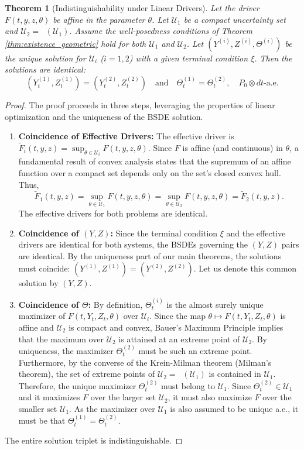 \documentclass[12pt, letterpaper]{amsart}
\newcommand{\Ucal}{\mathcal{U}}
\DeclareMathOperator*{\overlineconv}{\overline{conv}}
\theoremstyle{plain}
\newtheorem{theorem}{Theorem}[section]
\theoremstyle{definition}
\theoremstyle{remark}
\numberwithin{equation}{section} %
\begin{document}
\begin{theorem}[Indistinguishability under Linear Drivers]
\label{thm:indistinguishability_linear_revised}
Let the driver $F(t,y,z,\theta)$ be affine in the parameter $\theta$. Let $\Ucal_1$ be a compact uncertainty set and $\Ucal_2 = \overlineconv(\Ucal_1)$. Assume the well-posedness conditions of Theorem \ref{thm:existence_geometric} hold for both $\Ucal_1$ and $\Ucal_2$. Let $(Y^{(i)}, Z^{(i)}, \Theta^{(i)})$ be the unique solution for $\Ucal_i$ ($i=1,2$) with a given terminal condition $\xi$. Then the solutions are identical:
\[ (Y^{(1)}_t, Z^{(1)}_t) = (Y^{(2)}_t, Z^{(2)}_t) \quad \text{and} \quad \Theta^{(1)}_t = \Theta^{(2)}_t, \quad P_0 \otimes dt\text{-a.e.} \]
\end{theorem}
\begin{proof}
The proof proceeds in three steps, leveraging the properties of linear optimization and the uniqueness of the BSDE solution.
\begin{enumerate}
    \item \textbf{Coincidence of Effective Drivers:} The effective driver is $\tilde{F}_i(t,y,z) = \sup_{\theta \in \Ucal_i} F(t,y,z,\theta)$. Since $F$ is affine (and continuous) in $\theta$, a fundamental result of convex analysis \cite{Rockafellar1970} states that the supremum of an affine function over a compact set depends only on the set's closed convex hull. Thus,
    \[ \tilde{F}_1(t,y,z) = \sup_{\theta \in \Ucal_1} F(t,y,z,\theta) = \sup_{\theta \in \Ucal_2} F(t,y,z,\theta) = \tilde{F}_2(t,y,z). \]
    The effective drivers for both problems are identical.

    \item \textbf{Coincidence of $(Y,Z)$:} Since the terminal condition $\xi$ and the effective drivers are identical for both systems, the BSDEs governing the $(Y,Z)$ pairs are identical. By the uniqueness part of our main theorems, the solutions must coincide: $(Y^{(1)}, Z^{(1)}) = (Y^{(2)}, Z^{(2)})$. Let us denote this common solution by $(Y,Z)$.

    \item \textbf{Coincidence of $\Theta$:} By definition, $\Theta^{(i)}_t$ is the almost surely unique maximizer of $F(t,Y_t,Z_t,\theta)$ over $\Ucal_i$. Since the map $\theta \mapsto F(t,Y_t,Z_t,\theta)$ is affine and $\Ucal_2$ is compact and convex, Bauer's Maximum Principle implies that the maximum over $\Ucal_2$ is attained at an extreme point of $\Ucal_2$. By uniqueness, the maximizer $\Theta^{(2)}_t$ must be such an extreme point. Furthermore, by the converse of the Krein-Milman theorem (Milman's theorem), the set of extreme points of $\Ucal_2 = \overlineconv(\Ucal_1)$ is contained in $\Ucal_1$. Therefore, the unique maximizer $\Theta^{(2)}_t$ must belong to $\Ucal_1$.
    Since $\Theta^{(2)}_t \in \Ucal_1$ and it maximizes $F$ over the larger set $\Ucal_2$, it must also maximize $F$ over the smaller set $\Ucal_1$. As the maximizer over $\Ucal_1$ is also assumed to be unique a.e., it must be that $\Theta^{(1)}_t = \Theta^{(2)}_t$.
\end{enumerate}
The entire solution triplet is indistinguishable.
\end{proof}
\end{document}
